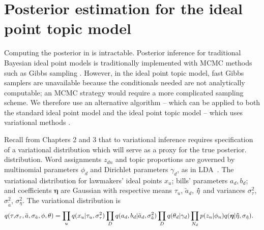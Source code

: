 






\section*{Posterior estimation for the ideal point topic model}
\label{sec:inference}
Computing the posterior in  is intractable.  Posterior
inference for traditional Bayesian ideal point models is traditionally
implemented with MCMC methods such as Gibbs sampling
\citep{johnson:1999ch6,jackman:2001,martin:2002,clinton:2004}.
However, in the ideal point topic model, fast Gibbs samplers are
unavailable because the conditionals needed are not analytically
computable; an MCMC strategy would require a more complicated sampling
scheme. We therefore use an alternative algorithm -- which can be applied
to both the standard ideal point model and the ideal point topic model
-- which uses variational methods \citep{jordan:1999}.

Recall from Chapters 2 and 3 that to variational inference requires
specification of a variational distribution which will serve as a
proxy for the true posterior.
distribution.  Word assignments $z_{dn}$ and topic proportions
are governed by multinomial parameters $\phi_d$ and Dirichlet
parameters $\gamma_d$, as in LDA~\citep{blei:2003}.  The variational
distribution for lawmakers' ideal points $x_u$; bills' parameters
$a_d, b_d$; and coefficients $\bm \eta$ are Gaussian with respective
means $\tau_u$, ${\tilde a}_d$, $\bm \hat \eta$ and variances $\sigma_\tau^2$,
$\sigma_{\tilde a}^2$, $\sigma_\eta^2$. The variational distribution is
\begin{align}
\label{eq:var_post}
q(\tau, & \sigma_\tau, {\tilde a}, \sigma_{\tilde a}, \phi, \theta) =
  \prod_u q(x_u | \tau_u, \sigma_\tau^2 ) \prod_D q(a_d, b_d |
{\tilde a}_d, \sigma_{\tilde a}^2 )
  \prod_D q(\theta_d | \gamma_d)
  \prod_{N_d} p(z_n | \phi_n) q(\bm \eta | \bm \hat \eta, \sigma_{\bm \hat \eta}).
\end{align}


